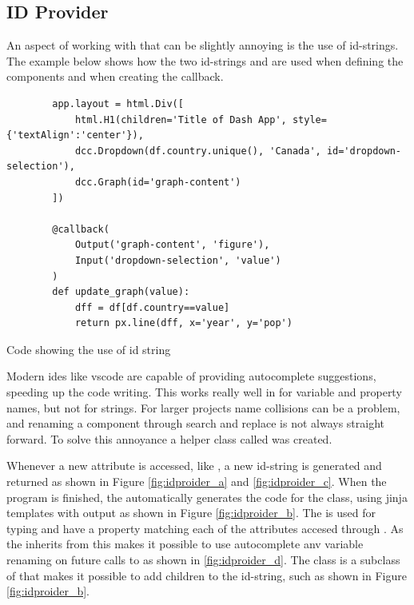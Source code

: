 

\subsection{ID Provider}
An aspect of working with \dash that can be slightly annoying is the use of id-strings.
The example below shows how the two id-strings  and  are used when defining the components and when creating the callback.
\begin{listing}[H]
    \begin{verbatim}
        app.layout = html.Div([
            html.H1(children='Title of Dash App', style={'textAlign':'center'}),
            dcc.Dropdown(df.country.unique(), 'Canada', id='dropdown-selection'),
            dcc.Graph(id='graph-content')
        ])

        @callback(
            Output('graph-content', 'figure'),
            Input('dropdown-selection', 'value')
        )
        def update_graph(value):
            dff = df[df.country==value]
            return px.line(dff, x='year', y='pop')
    \end{verbatim}
    \caption{Code showing the use of id string \cite{plotlyMinimalDashApp}}
\end{listing}

Modern \glspl{ide} like \gls{vscode} are capable of providing autocomplete suggestions, speeding up the code writing.
This works really well in for variable and property names, but not for strings.
For larger \dash projects name collisions can be a problem, and renaming a component through search and replace is not always straight forward.
To solve this annoyance a helper class called  was created.

Whenever a new attribute is accessed, like , a new id-string is generated and returned as shown in Figure \ref{fig:idproider_a} and \ref{fig:idproider_c}.
When the program is finished, the  automatically generates the code for the  class, using \gls{jinja} templates with output as shown in Figure \ref{fig:idproider_b}.
The  is used for typing and have a property matching each of the attributes accesed through .
As the  inherits from  this makes it possible to use autocomplete anv variable renaming on future calls to  as shown in \ref{fig:idproider_d}.
The  class is a subclass of  that makes it possible to add children to the id-string, such as  shown in Figure \ref{fig:idproider_b}.

